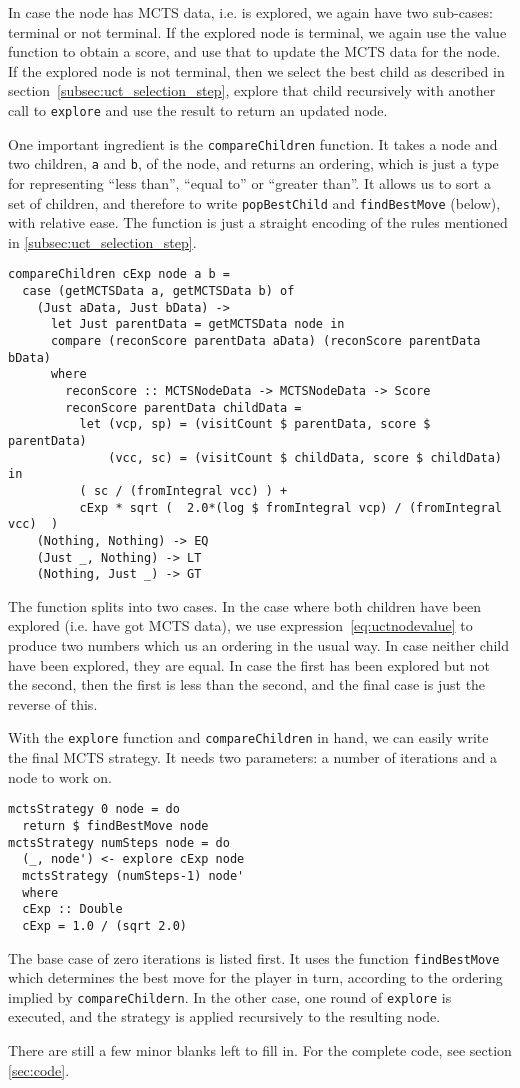 In case the node has MCTS data, i.e. is explored, we again have two sub-cases: terminal or not terminal.
If the explored node is terminal, we again use the value function to obtain a score, and use that to update the MCTS data for the node.
If the explored node is not terminal, then we select the best child as described in section~\ref{subsec:uct_selection_step}, explore that child recursively with another call to \texttt{explore} and use the result to return an updated node.

One important ingredient is the \texttt{compareChildren} function. It takes a node and two children, \texttt{a} and \texttt{b}, of the node, and returns an ordering, which is just a type for representing ``less than'', ``equal to'' or ``greater than''.
It allows us to sort a set of children, and therefore to write \texttt{popBestChild} and \texttt{findBestMove} (below), with relative ease.
The function is just a straight encoding of the rules mentioned in \ref{subsec:uct_selection_step}.
\begin{lstlisting}[frame=single]
compareChildren cExp node a b =
  case (getMCTSData a, getMCTSData b) of
    (Just aData, Just bData) ->
      let Just parentData = getMCTSData node in
      compare (reconScore parentData aData) (reconScore parentData bData)    
      where
        reconScore :: MCTSNodeData -> MCTSNodeData -> Score
        reconScore parentData childData =
          let (vcp, sp) = (visitCount $ parentData, score $ parentData)
              (vcc, sc) = (visitCount $ childData, score $ childData) in
          ( sc / (fromIntegral vcc) ) +
          cExp * sqrt (  2.0*(log $ fromIntegral vcp) / (fromIntegral vcc)  )
    (Nothing, Nothing) -> EQ
    (Just _, Nothing) -> LT
    (Nothing, Just _) -> GT
\end{lstlisting}
The function splits into two cases. In the case where both children have been explored (i.e. have got MCTS data), we use expression~\ref{eq:uctnodevalue} to produce two numbers which us an ordering in the usual way. In case neither child have been explored, they are equal. In case the first has been explored but not the second, then the first is less than the second, and the final case is just the reverse of this.

With the \texttt{explore} function and \texttt{compareChildren} in hand, we can easily write the final MCTS strategy. It needs two parameters: a number of iterations and a node to work on.
\begin{lstlisting}[frame=single]
mctsStrategy 0 node = do
  return $ findBestMove node
mctsStrategy numSteps node = do
  (_, node') <- explore cExp node
  mctsStrategy (numSteps-1) node'
  where
  cExp :: Double  
  cExp = 1.0 / (sqrt 2.0)
\end{lstlisting}
The base case of zero iterations is listed first. It uses the function \texttt{findBestMove} which determines the best move for the player in turn, according to the ordering implied by \texttt{compareChildern}. In the other case, one round of \texttt{explore} is executed, and the strategy is applied recursively to the resulting node.

There are still a few minor blanks left to fill in. For the complete code, see section \ref{sec:code}.
